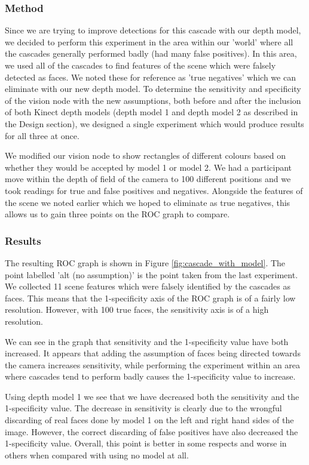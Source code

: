 \documentclass[conference]{IEEEtran}
\begin{document}
\subsubsection{Method}
Since we are trying to improve detections for this cascade with our depth model, we decided to perform this experiment in the area within our 'world' where all the cascades generally performed badly (had many false positives). In this area, we used all of the cascades to find features of the scene which were falsely detected as faces. We noted these for reference as 'true negatives' which we can eliminate with our new depth model.
To determine the sensitivity and specificity of the vision node with the new assumptions, both before and after the inclusion of both Kinect depth models (depth model 1 and depth model 2 as described in the Design section), we designed a single experiment which would produce results for all three at once.

We modified our vision node to show rectangles of different colours based on whether they would be accepted by model 1 or model 2. We had a participant move within the depth of field of the camera to 100 different positions and we took readings for true and false positives and negatives. Alongside the features of the scene we noted earlier which we hoped to eliminate as true negatives, this allows us to gain three points on the ROC graph to compare.
\subsubsection{Results}
The resulting ROC graph is shown in Figure \ref{fig:cascade_with_model}. The point labelled 'alt (no assumption)' is the point taken from the last experiment. We collected 11 scene features which were falsely identified by the cascades as faces. This means that the 1-specificity axis of the ROC graph is of a fairly low resolution. However, with 100 true faces, the sensitivity axis is of a high resolution.

We can see in the graph that sensitivity and the 1-specificity value have both increased. It appears that adding the assumption of faces being directed towards the camera increases sensitivity, while performing the experiment within an area where cascades tend to perform badly causes the 1-specificity value to increase.

Using depth model 1 we see that we have decreased both the sensitivity and the 1-specificity value. The decrease in sensitivity is clearly due to the wrongful discarding of real faces done by model 1 on the left and right hand sides of the image. However, the correct discarding of false positives have also decreased the 1-specificity value. Overall, this point is better in some respects and worse in others when compared with using no model at all.
\end{document}
